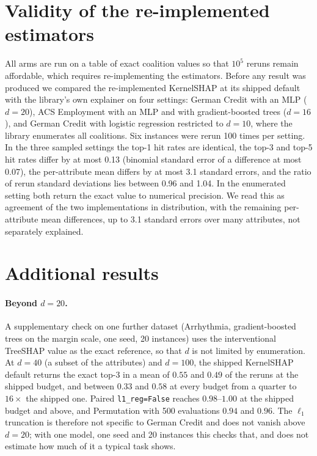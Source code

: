 \section{Validity of the re-implemented estimators}
\label{app:e0}

All arms are run on a table of exact coalition values so that $10^5$ reruns remain affordable, which requires re-implementing the estimators. Before any result was produced we compared the re-implemented KernelSHAP at its shipped default with the library's own explainer on four settings: German Credit with an MLP ($d=20$), ACS Employment with an MLP and with gradient-boosted trees ($d=16$), and German Credit with logistic regression restricted to $d=10$, where the library enumerates all coalitions. Six instances were rerun 100 times per setting. In the three sampled settings the top-1 hit rates are identical, the top-3 and top-5 hit rates differ by at most 0.13 (binomial standard error of a difference at most 0.07), the per-attribute mean differs by at most 3.1 standard errors, and the ratio of rerun standard deviations lies between 0.96 and 1.04. In the enumerated setting both return the exact value to numerical precision. We read this as agreement of the two implementations in distribution, with the remaining per-attribute mean differences, up to 3.1 standard errors over many attributes, not separately explained.


\section{Additional results}
\label{app:extra}

\paragraph{Beyond $d=20$.}
A supplementary check on one further dataset (Arrhythmia, gradient-boosted trees on the margin scale, one seed, 20 instances) uses the interventional TreeSHAP value as the exact reference, so that $d$ is not limited by enumeration. At $d=40$ (a subset of the attributes) and $d=100$, the shipped KernelSHAP default returns the exact top-3 in a mean of $0.55$ and $0.49$ of the reruns at the shipped budget, and between $0.33$ and $0.58$ at every budget from a quarter to $16\times$ the shipped one. Paired \texttt{l1\_reg=False} reaches $0.98$--$1.00$ at the shipped budget and above, and Permutation with 500 evaluations $0.94$ and $0.96$. The $\ell_1$ truncation is therefore not specific to German Credit and does not vanish above $d=20$; with one model, one seed and 20 instances this checks that, and does not estimate how much of it a typical task shows.

